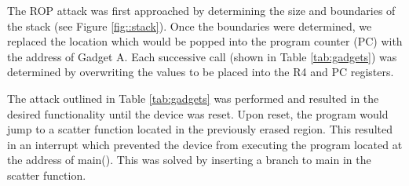 The ROP attack was first approached by determining the size and boundaries of the stack (see Figure \ref{fig::stack}). Once the boundaries were determined, we replaced the location which would be popped into the program counter (PC) with the address of Gadget A. Each successive call (shown in Table \ref{tab:gadgets}) was determined by overwriting the values to be placed into the R4 and PC registers.

The attack outlined in Table \ref{tab:gadgets} was performed and resulted in the desired functionality until the device was reset. Upon reset, the program would jump to a scatter function located in the previously erased region. This resulted in an interrupt which prevented the device from executing the program located at the address of main(). This was solved by inserting a branch to main in the scatter function. 

